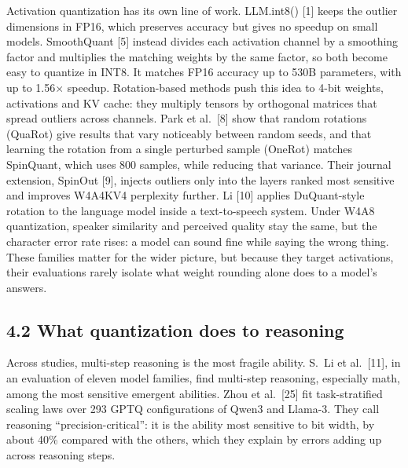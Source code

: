 \documentclass[10pt,twocolumn]{article}
\begin{document}
Activation quantization has its own line of work. LLM.int8() [1] keeps
the outlier dimensions in FP16, which preserves accuracy but gives no
speedup on small models. SmoothQuant [5] instead divides each activation
channel by a smoothing factor and multiplies the matching weights by the
same factor, so both become easy to quantize in INT8. It matches FP16
accuracy up to 530B parameters, with up to 1.56$\times$ speedup.
Rotation-based methods push this idea to 4-bit weights, activations and
KV cache: they multiply tensors by orthogonal matrices that spread
outliers across channels. Park et al.~[8] show that random rotations
(QuaRot) give results that vary noticeably between random seeds, and
that learning the rotation from a single perturbed sample (OneRot)
matches SpinQuant, which uses 800 samples, while reducing that variance.
Their journal extension, SpinOut [9], injects outliers only into the
layers ranked most sensitive and improves W4A4KV4 perplexity further.
Li [10] applies DuQuant-style rotation to the language model inside a
text-to-speech system. Under W4A8 quantization, speaker similarity and
perceived quality stay the same, but the character error rate rises: a
model can sound fine while saying the wrong thing. These families matter
for the wider picture, but because they target activations, their
evaluations rarely isolate what weight rounding alone does to a model's
answers.

\subsection{4.2 What quantization does to reasoning}

Across studies, multi-step reasoning is the most fragile ability.
S.~Li et al.~[11], in an evaluation of eleven model families, find
multi-step reasoning, especially math, among the most sensitive emergent
abilities. Zhou et al.~[25] fit task-stratified scaling laws over 293
GPTQ configurations of Qwen3 and Llama-3. They call reasoning
``precision-critical'': it is the ability most sensitive to bit width,
by about 40\% compared with the others, which they explain by errors
adding up across reasoning steps.
\end{document}
